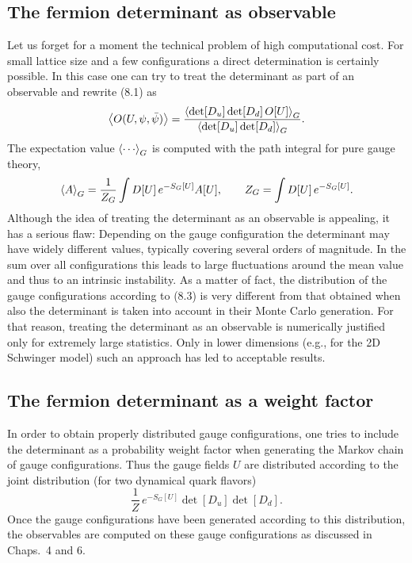 \subsection{The fermion determinant as observable}

Let us forget for a moment the technical problem of high computational cost.
For small lattice size and a few configurations a direct determination is
certainly possible. In this case one can try to treat the determinant as part
of an observable and rewrite (8.1) as
\begin{equation}
\left\langle O(U,\psi,\bar{\psi}) \right\rangle = \frac{\left\langle \det[D_u]\det[D_d]\,O[U] \right\rangle_G}{\left\langle \det[D_u]\det[D_d] \right\rangle_G}.
\end{equation}
The expectation value $\ev{\cdots}_G$ is computed with the path integral for
pure gauge theory,
\begin{equation}
\left\langle A \right\rangle_G = \frac{1}{Z_G}\int D[U]\,e^{-S_G[U]}A[U], \qquad
Z_G = \int D[U]\,e^{-S_G[U]}.
\end{equation}
Although the idea of treating the determinant as an observable is appealing, it
has a serious flaw: Depending on the gauge configuration the determinant may
have widely different values, typically covering several orders of magnitude.
In the sum over all configurations this leads to large fluctuations around the
mean value and thus to an intrinsic instability. As a matter of fact, the
distribution of the gauge configurations according to (8.3) is very different
from that obtained when also the determinant is taken into account in their
Monte Carlo generation.
For that reason, treating the determinant as an observable is numerically
justified only for extremely large statistics. Only in lower dimensions (e.g.,
for the 2D Schwinger model) such an approach has led to acceptable results.

\subsection{The fermion determinant as a weight factor}

In order to obtain properly distributed gauge configurations, one tries to
include the determinant as a probability weight factor when generating the
Markov chain of gauge configurations. Thus the gauge fields $U$ are distributed
according to the joint distribution (for two dynamical quark flavors)
\begin{equation}
\frac{1}{Z}\,e^{-S_G[U]}\det[D_u]\det[D_d].
\end{equation}
Once the gauge configurations have been generated according to this
distribution, the observables are computed on these gauge configurations as
discussed in Chaps.~4 and 6.

